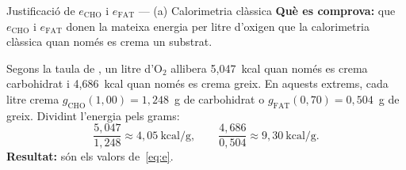 \documentclass[10pt,a4paper]{article}
\newcommand{\sub}[1]{{\scriptscriptstyle\mathrm{#1}}}   %
\newcommand{\CHO}{\sub{CHO}}
\newcommand{\FAT}{\sub{FAT}}
\newcommand{\kcal}{\ensuremath{\mathrm{kcal}}}
\begin{document}
\begin{requadre}{Justificació de $e_{\CHO}$ i $e_{\FAT}$ --- (a) Calorimetria clàssica}
\textbf{Què es comprova:} que $e_{\CHO}$ i $e_{\FAT}$ donen la mateixa energia per litre
d'oxigen que la calorimetria clàssica quan només es crema un substrat.

\smallskip
Segons la taula de \citet{peronnet1991}, un litre d'O$_2$ allibera 5,047~kcal quan només
es crema carbohidrat i 4,686~kcal quan només es crema greix. En aquests extrems, cada litre
crema $g_{\CHO}(1{,}00)=1{,}248$~g de carbohidrat o $g_{\FAT}(0{,}70)=0{,}504$~g de greix.
Dividint l'energia pels grams:
\[
  \frac{5{,}047}{1{,}248}\approx4{,}05~\kcal/\mathrm{g},\qquad
  \frac{4{,}686}{0{,}504}\approx9{,}30~\kcal/\mathrm{g}.
\]
\textbf{Resultat:} són els valors de~\eqref{eq:e}.
\end{requadre}
\end{document}
